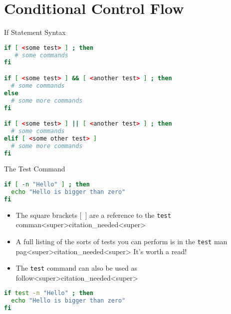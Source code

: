 \documentclass[11pt]{beamer}
\begin{document}
\section[Conditionals]{Conditional Control Flow}
\begin{frame}[fragile=singleslide]{If Statement Syntax}
\begin{lstlisting}[style=terminal, language=bash]
if [ <some test> ] ; then
   # some commands
fi

if [ <some test> ] && [ <another test> ] ; then
  # some commands
else 
  # some more commands
fi

if [ <some test> ] || [ <another test> ] ; then
  # some commands
elif [ <some other test> ]
  # some more commands
fi
\end{lstlisting}
\end{frame}

\begin{frame}[fragile=singleslide]{The Test Command}
\begin{lstlisting}[style=terminal, language=bash]
if [ -n "Hello" ] ; then
  echo "Hello is bigger than zero"
fi
\end{lstlisting}
\begin{itemize}
\item The square brackets \texttt{$[$ $]$} are a reference to the \texttt{test} comman<super>citation_needed<super>
\item A full listing of the sorts of tests you can perform is in the \texttt{test} man pag<super>citation_needed<super>  It's worth a read! 
\item The \texttt{test} command can also be used as follow<super>citation_needed<super>
\end{itemize}
\begin{lstlisting}[style=terminal, language=bash]
if test -n "Hello" ; then
  echo "Hello is bigger than zero"
fi
\end{lstlisting}
\end{frame}
\end{document}
